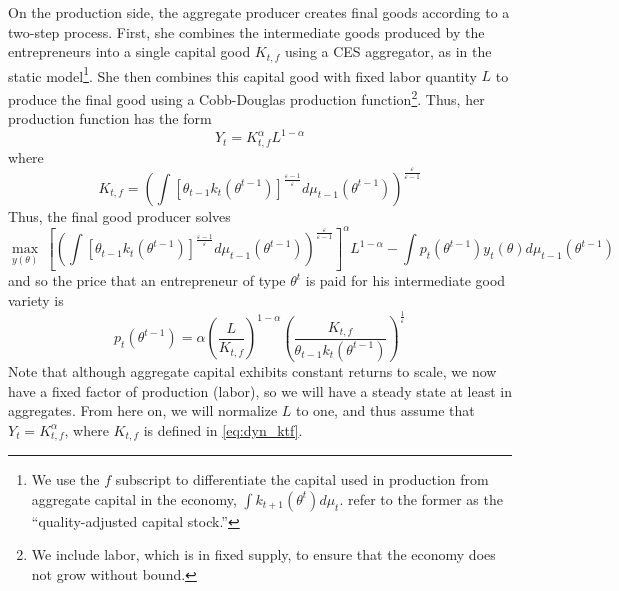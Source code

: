 \documentclass[11pt]{article}
\begin{document}
On the production side, the aggregate producer creates final goods
according to a two-step process. First, she combines the intermediate
goods produced by the entrepreneurs into a single capital good $K_{t,f}$
using a CES aggregator, as in the static model\footnote{We use the \( f \) subscript to differentiate the capital used in production from aggregate capital in the economy, \( \int k_{t+1}\left( \theta^t \right)d\mu_t \). \cite{guvenen2019use} refer to the former as the ``quality-adjusted capital stock.''}. She then combines this capital good with fixed labor quantity $L$ to produce the final good using a Cobb-Douglas production function\footnote{We include labor, which is in fixed supply, to ensure that the economy does not grow without bound.}. Thus, her production
function has the form 
\begin{equation}
Y_{t}=K_{t,f}^{\alpha}L^{1-\alpha}
\end{equation}
where 
\begin{equation}
K_{t,f}=\left(\int\left[\theta_{t-1}k_{t}\left(\theta^{t-1}\right)\right]^{\frac{\varepsilon-1}{\varepsilon}}d\mu_{t-1}\left(\theta^{t-1}\right)\right)^{\frac{\varepsilon}{\varepsilon-1}} \label{eq:dyn_ktf}
\end{equation}
Thus, the final good producer solves 
\begin{equation}
\max_{y\left(\theta\right)}\ \left[\left(\int\left[\theta_{t-1}k_{t}\left(\theta^{t-1}\right)\right]^{\frac{\varepsilon-1}{\varepsilon}}d\mu_{t-1}\left(\theta^{t-1}\right)\right)^{\frac{\varepsilon}{\varepsilon-1}}\right]^{\alpha}L^{1-\alpha}-\int p_{t}\left(\theta^{t-1}\right)y_{t}\left(\theta\right)d\mu_{t-1}\left(\theta^{t-1}\right)
\end{equation}
and so the price that an entrepreneur of type \( \theta^t \) is paid for his intermediate good variety is 
\begin{equation}
p_{t}\left(\theta^{t-1}\right)=\alpha\left(\frac{L}{K_{t,f}}\right)^{1-\alpha}\left(\frac{K_{t,f}}{\theta_{t-1}k_{t}\left(\theta^{t-1}\right)}\right)^{\frac{1}{\varepsilon}} \label{eq:dyn_pt}
\end{equation}
Note that although aggregate capital exhibits constant returns to
scale, we now have a fixed factor of production (labor), so we will
have a steady state at least in aggregates. From here on, we will normalize \( L \) to one, and thus assume that \( Y_t = K_{t,f}^\alpha \), where \( K_{t,f} \) is defined in \eqref{eq:dyn_ktf}. 
\end{document}
